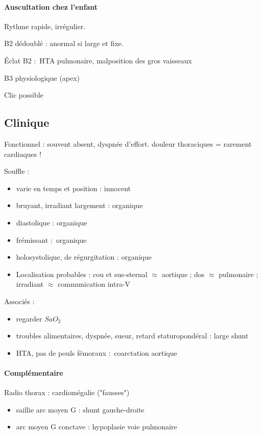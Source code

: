 \documentclass{article}
\begin{document}
\paragraph{Auscultation chez l'enfant} Rythme rapide, irrégulier.

B2 dédoublé : anormal si large et fixe.

Éclat B2 : HTA pulmonaire, malposition des gros vaisseaux

B3 physiologique (apex)

Clic possible

\subsection{Clinique}
Fonctionnel : souvent absent, dyspnée d'effort. \danger douleur thoraciques =
rarement cardiaques !

Souffle :
\begin{itemize}
  \item varie en temps et position : innocent
  \item bruyant, irradiant largement : organique
  \item diastolique : organique
  \item frémissant : organique
  \item holosystolique, de régurgitation : organique
  \item Localisation probables : cou et sus-sternal $\approx$ aortique ;
    dos $\approx$ pulmonaire ; irradiant $\approx$ 
    communication intra-V
\end{itemize}
Associés : 
\begin{itemize}
  \item regarder $SaO_2$
  \item troubles alimentaires, dyspnée, sueur, retard staturopondéral : large
    shunt
  \item HTA, pas de pouls fémoraux : coarctation aortique
\end{itemize}

\paragraph{Complémentaire}
Radio thorax : cardiomégalie (\danger "fausses")
\begin{itemize}
  \item saillie arc moyen G : shunt gauche-droite
  \item arc moyen G conctave : hypoplasie voie pulmonaire
\end{itemize}
\end{document}
